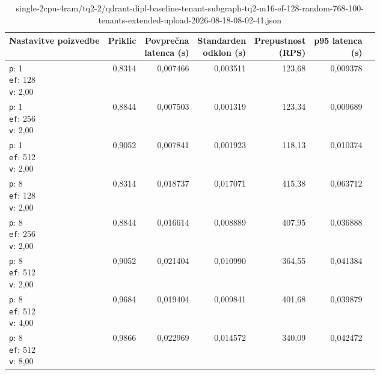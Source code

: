 \begin{table}[htbp]
  \centering
\small
  \caption{single-2cpu-4ram/tq2-2/qdrant-dipl-baseline-tenant-subgraph-tq2-m16-ef-128-random-768-100-tenants-extended-upload-2026-08-18-08-02-41.json}
  \label{tab:single-2cpu-4ram:tq2-2:qdrant-dipl-baseline-tenant-subgraph-tq2-m16-ef-128-random-768-100-tenants-extended-upload-2026-08-18-08-02-41.json}
  \begin{tabularx}{\textwidth}{Xrrrrrr}
    \toprule
    Nastavitve poizvedbe & Priklic & \makecell{Povprečna\\latenca (s)} & \makecell{Standarden\\odklon (s)} & \makecell{Prepustnost\\(RPS)} & \makecell{p95 latenca\\(s)}  \\
    \midrule
    \makecell{\texttt{p}: 1\\\texttt{ef}: 128\\\texttt{v}: 2,00} & 0,8314 & 0,007466 & 0,003511 & 123,68 & 0,009378 \\
    \makecell{\texttt{p}: 1\\\texttt{ef}: 256\\\texttt{v}: 2,00} & 0,8844 & 0,007503 & 0,001319 & 123,34 & 0,009689 \\
    \makecell{\texttt{p}: 1\\\texttt{ef}: 512\\\texttt{v}: 2,00} & 0,9052 & 0,007841 & 0,001923 & 118,13 & 0,010374 \\
    \makecell{\texttt{p}: 8\\\texttt{ef}: 128\\\texttt{v}: 2,00} & 0,8314 & 0,018737 & 0,017071 & 415,38 & 0,063712 \\
    \makecell{\texttt{p}: 8\\\texttt{ef}: 256\\\texttt{v}: 2,00} & 0,8844 & 0,016614 & 0,008889 & 407,95 & 0,036888 \\
    \makecell{\texttt{p}: 8\\\texttt{ef}: 512\\\texttt{v}: 2,00} & 0,9052 & 0,021404 & 0,010990 & 364,55 & 0,041384 \\
    \makecell{\texttt{p}: 8\\\texttt{ef}: 512\\\texttt{v}: 4,00} & 0,9684 & 0,019404 & 0,009841 & 401,68 & 0,039879 \\
    \makecell{\texttt{p}: 8\\\texttt{ef}: 512\\\texttt{v}: 8,00} & 0,9866 & 0,022969 & 0,014572 & 340,09 & 0,042472 \\

\end{tabularx}
\end{table}
